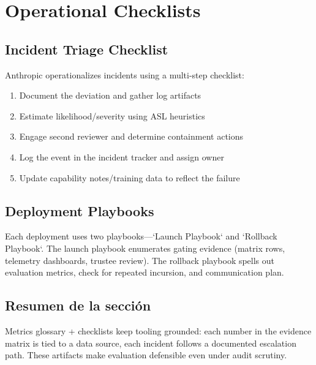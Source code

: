 \section{Operational Checklists}

\subsection{Incident Triage Checklist}

Anthropic operationalizes incidents using a multi-step checklist:

\begin{enumerate}
    \item Document the deviation and gather log artifacts
    \item Estimate likelihood/severity using ASL heuristics
    \item Engage second reviewer and determine containment actions
    \item Log the event in the incident tracker and assign owner
    \item Update capability notes/training data to reflect the failure
\end{enumerate}

\subsection{Deployment Playbooks}

Each deployment uses two playbooks—`Launch Playbook` and `Rollback Playbook`. The launch playbook enumerates gating evidence (matrix rows, telemetry dashboards, trustee review). The rollback playbook spells out evaluation metrics, check for repeated incursion, and communication plan.

\subsection{Resumen de la sección}

Metrics glossary + checklists keep tooling grounded: each number in the evidence matrix is tied to a data source, each incident follows a documented escalation path. These artifacts make evaluation defensible even under audit scrutiny.

